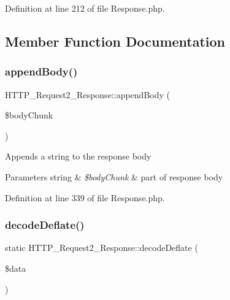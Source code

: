 Definition at line 212 of file Response.\+php.



\subsection{Member Function Documentation}
\hypertarget{classHTTP__Request2__Response_a9c058efa93fa093f9e2ea3899aaafd81}{}\label{classHTTP__Request2__Response_a9c058efa93fa093f9e2ea3899aaafd81} 
\subsubsection{\texorpdfstring{append\+Body()}{appendBody()}}
{\footnotesize\ttfamily H\+T\+T\+P\+\_\+\+Request2\+\_\+\+Response\+::append\+Body (\begin{DoxyParamCaption}\item[{}]{\$body\+Chunk }\end{DoxyParamCaption})}

Appends a string to the response body


\begin{DoxyParams}[1]{Parameters}
string & {\em \$body\+Chunk} & part of response body \\
\hline
\end{DoxyParams}


Definition at line 339 of file Response.\+php.

\hypertarget{classHTTP__Request2__Response_ae43f4b1062afa9036c71e3c506d5979e}{}\label{classHTTP__Request2__Response_ae43f4b1062afa9036c71e3c506d5979e} 
\subsubsection{\texorpdfstring{decode\+Deflate()}{decodeDeflate()}}
{\footnotesize\ttfamily static H\+T\+T\+P\+\_\+\+Request2\+\_\+\+Response\+::decode\+Deflate (\begin{DoxyParamCaption}\item[{}]{\$data }\end{DoxyParamCaption})\hspace{0.3cm}{\ttfamily [static]}}

